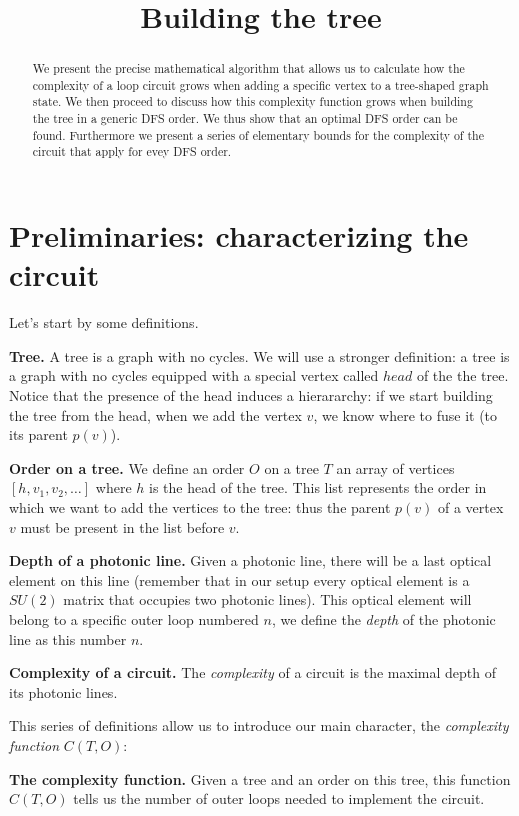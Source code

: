 \documentclass{article}
\title{Building the tree}
\date{}
\begin{document}
\maketitle
\begin{abstract}
    We present the precise mathematical algorithm that allows us to calculate how the complexity of a loop circuit grows when adding a specific vertex to a tree-shaped graph state. We then proceed to discuss how this complexity function grows when building the tree in a generic DFS order. We thus show that an optimal DFS order can be found. Furthermore we present a series of elementary bounds for the complexity of the circuit that apply for evey DFS order.
\end{abstract}

\tableofcontents

\newpage
\section{Preliminaries: characterizing the circuit}
Let's start by some definitions.

\textbf{Tree.} A tree is a graph with no cycles. We will use a stronger definition: a tree is a graph with no cycles equipped with a special vertex called $head$ of the the tree. Notice that the presence of the head induces a hierararchy: if we start building the tree from the head, when we add the vertex $v$, we know where to fuse it (to its parent $p(v)$).

\textbf{Order on a tree.} We define an order $O$ on a tree $T$ an array of vertices $[h, v_1, v_2, \dots]$ where $h$ is the head of the tree. This list represents the order in which we want to add the vertices to the tree: thus the parent $p(v)$ of a vertex $v$ must be present in the list before $v$.

\textbf{Depth of a photonic line.} Given a photonic line, there will be a last optical element on this line (remember that in our setup every optical element is a $SU(2)$ matrix that occupies two photonic lines). This optical element will belong to a specific outer loop numbered $n$, we define the \textit{depth} of the photonic line as this number $n$.

\textbf{Complexity of a circuit.} The \textit{complexity} of a circuit is the maximal depth of its photonic lines.

This series of definitions allow us to introduce our main character, the \textit{complexity function} $C(T, O)$:

\textbf{The complexity function.} Given a tree and an order on this tree, this function $C(T, O)$ tells us the number of outer loops needed to implement the circuit.
\end{document}
